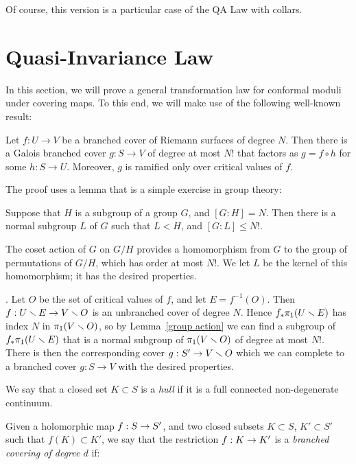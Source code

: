 Of course, this version is a particular case of the QA Law with collars.



\section{Quasi-Invariance Law}

In this section, we
will prove a general transformation law for conformal moduli under covering maps.
To this end, we will make use of the following well-known result:

\begin{prop} \label{galois}
Let $f: U \to V$ be a branched cover of Riemann surfaces of degree $N$. 
Then there is a Galois branched cover $g : S \to V$ of degree at most $N!$ 
that factors as $g = f \circ h$ for some $h: S \to U$.
Moreover, $g$ is ramified only over critical values of $f$. 
\end{prop}

The proof uses a lemma that is a simple exercise in group theory:

\begin{lem}\label{group action}
Suppose that $H$ is a subgroup of a group $G$, and \break $[G:H] = N$. 
Then there is a normal subgroup $L$ of $G$ such that $L < H$, and $[G:L] \le N!$.
\end{lem}

\begin{pf}
The coset action of $G$ on $G/H$ provides a homomorphism from $G$ to the group of permutations of $G/H$, 
which has order at most $N!$. We let $L$ be the kernel of this homomorphism; it has the desired properties.
\end{pf}

. 
Let $O$ be the set of critical values of $f$, and let $E=f^{-1}(O)$.
Then $f: U \smallsetminus E \to V \smallsetminus O$ is an unbranched cover of degree $N$. 
Hence  $f_*\pi_1(U\smallsetminus E)$ has index $N$ in $\pi_1(V\smallsetminus O)$, 
so by Lemma~\ref{group action} we can find a subgroup of $f_*\pi_1(U\smallsetminus E)$ that is a  normal subgroup of $\pi_1(V\smallsetminus O)$
of degree at most $N!$. There is then the corresponding cover $g: S' \to V\smallsetminus O$ which we can complete to a branched cover 
$g: S \to V$ with the desired properties. 
\QED



 We say that a closed set $K\subset S$ is a {\it hull}
if it is a full connected non-degenerate continuum.

Given a holomorphic map $f: S\rightarrow S'$, and two closed subsets $K\subset S$, $K'\subset S'$ such that
$f(K)\subset K'$, we say that the restriction $f: K\rightarrow K'$ is a {\it branched covering of degree $d$} if:


